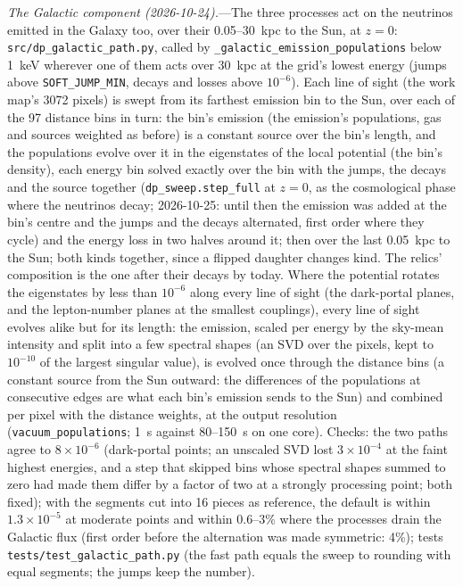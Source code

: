 \documentclass[11pt,a4paper]{article}
\newcommand{\file}[1]{\nolinkurl{#1}}
\begin{document}
\textit{The Galactic component (2026-10-24).}---The three processes act on the neutrinos emitted in the Galaxy too, over
their 0.05--30~kpc to the Sun, at $z = 0$: \file{src/dp\_galactic\_path.py}, called by
\texttt{\_galactic\_emission\_populations} below 1~keV wherever one of them acts over 30~kpc at the grid's lowest
energy (jumps above \texttt{SOFT\_JUMP\_MIN}, decays and losses above $10^{-6}$). Each line of sight (the work map's 3072
pixels) is swept from its farthest emission bin to the Sun, over each of the 97 distance bins in turn: the bin's
emission (the emission's populations, gas and sources weighted as before) is a constant source over the bin's length,
and the populations evolve over it in the eigenstates of the local potential (the bin's density), each energy bin
solved exactly over the bin with the jumps, the decays and the source together (\texttt{dp\_sweep.step\_full} at
$z = 0$, as the cosmological phase where the neutrinos decay; 2026-10-25: until then the emission was added at the bin's
centre and the jumps and the decays alternated, first order where they cycle) and the energy loss in two halves around
it; then over the last 0.05~kpc to the Sun; both kinds together, since a flipped daughter changes kind. The relics' composition is the one after their decays by today. Where the potential
rotates the eigenstates by less than $10^{-6}$ along every line of sight (the dark-portal planes, and the lepton-number
planes at the smallest couplings), every line of sight evolves alike but for its length: the emission, scaled per energy
by the sky-mean intensity and split into a few spectral shapes (an SVD over the pixels, kept to $10^{-10}$ of the largest
singular value), is evolved once through the distance bins (a constant source from the Sun outward: the differences
of the populations at consecutive edges are what each bin's emission sends to the Sun) and combined per pixel with the
distance weights, at the output resolution (\texttt{vacuum\_populations}; 1~s against 80--150~s on one core). Checks: the two paths agree to
$8\times10^{-6}$ (dark-portal points; an unscaled SVD lost $3\times10^{-4}$ at the faint highest energies, and a step
that skipped bins whose spectral shapes summed to zero had made them differ by a factor of two at a strongly processing
point; both fixed); with the segments cut into 16 pieces as reference, the default is within $1.3\times10^{-5}$ at
moderate points and within $0.6$--$3\%$ where the processes drain the Galactic flux (first order before the alternation
was made symmetric: 4\%); tests \file{tests/test\_galactic\_path.py} (the fast path equals the sweep to rounding with equal
segments; the jumps keep the number).
\end{document}

